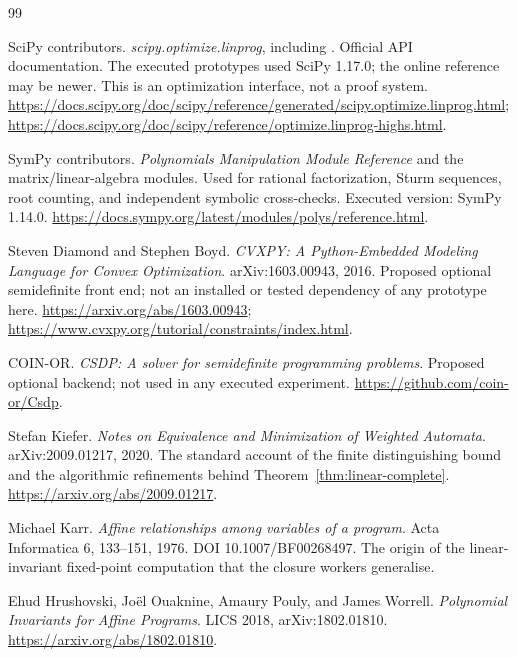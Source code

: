 \begin{thebibliography}{99}

SciPy contributors. \emph{scipy.optimize.linprog}, including
. Official API documentation. The executed prototypes
used SciPy 1.17.0; the online reference may be newer. This is an optimization
interface, not a proof system.
\url{https://docs.scipy.org/doc/scipy/reference/generated/scipy.optimize.linprog.html};
\url{https://docs.scipy.org/doc/scipy/reference/optimize.linprog-highs.html}.

SymPy contributors. \emph{Polynomials Manipulation Module Reference} and the
matrix/linear-algebra modules. Used for rational factorization, Sturm
sequences, root counting, and independent symbolic cross-checks. Executed
version: SymPy 1.14.0.
\url{https://docs.sympy.org/latest/modules/polys/reference.html}.

Steven Diamond and Stephen Boyd. \emph{CVXPY: A Python-Embedded Modeling
Language for Convex Optimization}. arXiv:1603.00943, 2016. Proposed optional
semidefinite front end; not an installed or tested dependency of any
prototype here.
\url{https://arxiv.org/abs/1603.00943};
\url{https://www.cvxpy.org/tutorial/constraints/index.html}.

COIN-OR. \emph{CSDP: A solver for semidefinite programming problems}.
Proposed optional backend; not used in any executed experiment.
\url{https://github.com/coin-or/Csdp}.


Stefan Kiefer. \emph{Notes on Equivalence and Minimization of Weighted
Automata}. arXiv:2009.01217, 2020. The standard account of the finite
distinguishing bound and the algorithmic refinements behind
Theorem~\ref{thm:linear-complete}.
\url{https://arxiv.org/abs/2009.01217}.

Michael Karr. \emph{Affine relationships among variables of a program}. Acta
Informatica 6, 133--151, 1976. DOI 10.1007/BF00268497. The origin of the
linear-invariant fixed-point computation that the closure workers generalise.

Ehud Hrushovski, Jo\"el Ouaknine, Amaury Pouly, and James Worrell.
\emph{Polynomial Invariants for Affine Programs}. LICS 2018, arXiv:1802.01810.
\url{https://arxiv.org/abs/1802.01810}.


\end{thebibliography}
